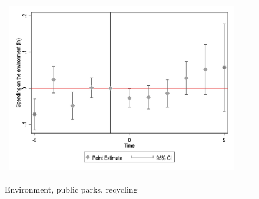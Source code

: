 \begin{figure}[!ht]
\begin{tabular}{@{}ccc@{}}
\begin{minipage}[t]{0.32\textwidth}
            \centering
            \caption{Environment, public parks, recycling}
            \includegraphics[width=\linewidth]{images/pop_10000/caseventdd_ln_q4_09_step1.jpg}
            \label{fig:casenvironment}
        \end{minipage}
    \end{tabular}
\end{figure}

